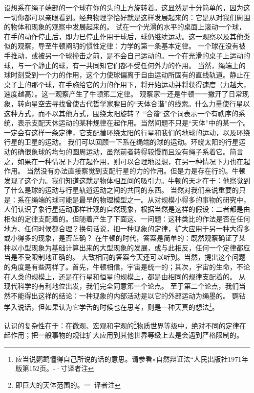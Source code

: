 设想系在绳子端部的一个球在你的头的上方旋转着。这显然是十分简单的，因为这一切你都可以亲眼看到。经典物理学恰好就是这样发展起来的：它是从对我们周围的物体和现象的观察中发展起来的。
试在一个光滑的水平的桌面上滚动一个球，在手的动作停止后，即力巳停止作用于球后，球仍继续运动。这一观察以及其他类似的观察，导至牛顿阐明的惯性定律：力学的第一条基本定律。
一个球在没有被手推动，或被另一个球撞击之前，是不会自己运动的。一个在光滑的桌子上运动的球，与一个静止的球，有一共同知它们都不受任何外力的作用。
当然，绳端上的球时刻受到一个力的作用，这个力使球偏离于自由运动所固有的直线轨道。静止在桌子上的那个球，在手施给它的力的作用下，将开始运动并将获得速度（力越大，速度越高）。这一观察产生了牛顿笫二定律。
观察家一还是牛顿一一撇开了日常现象，转向星空去寻找曾使古代哲学家膛目的“天体合谐”的线索。什么力量使行星以这种方式，而不以其他方式，围绕太阳旋转？
“合谐“这个词表示一个有祑序的系统，表示支配天休运动的某种规律在起作用。当然间题不只是“天体”中的某一个。一定会有这样一条定律，它支配蓿环绕太阳的行星和我们的地球的运动，以及环绕行星的卫星的运动。
我们可以回顾一下系在绳端的球的运动。环绕太阳的行星运动的确很象球的均匀的圆周运动，虽然前者转得较慢而且没有绳子系着它。简言之，如果在一种情况下力在起作用，则可以合理地设想，在另一种情况下力也在起作用。
当然没有办法直接察觉到支配行星的力的作用。但是力是存在行的。牛顿发现了这个力。我们知道这就是物体相互间的吸引力。牛顿的天才在于：他察觉到了什么是球的运动与行星轨逍运动之间的共同的东西。
当然对我们来说重要的只是：系在绳端的球可能是最早的物理模型之一。从对规模小得多的事物的研究中，人们认识了象行星运动那样壮观的自然现象，根据当然是这样的假设：二者都是由相似的定律支配着的。但随着产生了下面这、一问题：这种类比的作法是否在任何地方、任何时候都合理？换句话说，把一种现象的定律，扩大应用于另一种大得多或小得多的现象，是否芷确？
在牛顿的时代，答案是简单的：既然观察确证了某种以小型现象为基础计算出来的大型现象的发展，或与此相反，任何一个定律都应当是不受限制地正确的。
大致相同的答案今天还可以听到。当然，提出这个问题的角度是有些两样了。首先，牛顿相信，宇宙是统一的；其次，宇宙的生命，不论在人类的规模上，还是在行星和恒星的规模上，都是由相同的规律支配着的。
从现代科学的有利地位出发，我们完全同意笫一个论点。
至于第二个论点，我们当然不能得出这祥的结论：一种现象的内部活动是以它的外部运动为绳墨的。
鹦钻学入说话，但如果认为它学舌的时候也在思考，则是一种天真的想法\footnote{应当说鹦鹉懂得自己所说的话的意思。请参看«自然辩证法“人民出版社1971年版第152页。-·寸译者注}。

认识的复杂性在于：在微观、宏观和宇观的\footnote{即巨大的天体范围的。一~译者注}物质世界等级中，绝对不同的定律在起作用；把一般事物的规律扩大应用到其他世界等级上去是会遇到严格限制的。

